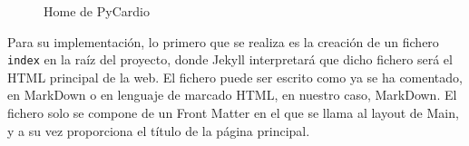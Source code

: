 \begin{figure}[h!]
    \centering
    \par
    \par
    \caption{Home de PyCardio}
    \label{fig:homePyCardio}
\end{figure}

Para su implementación, lo primero que se realiza es la creación de un fichero \texttt{index} en la raíz del proyecto, donde Jekyll interpretará que dicho fichero será el HTML principal de la web. El fichero puede ser escrito como ya se ha comentado, en MarkDown o en lenguaje de marcado HTML, en nuestro caso, MarkDown. El fichero solo se compone de un Front Matter en el que se llama al layout de Main, y a su vez proporciona el título de la página principal. \\



